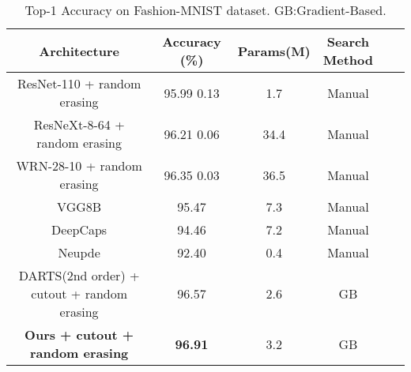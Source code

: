 \documentclass[10pt,a4paper,conference]{IEEEtran}
\begin{document}
\begin{table*}[tbp]
    \centering
    \begin{tabular}{c|c|c|ccc}
    \toprule
    Architecture & Accuracy (\%) & Params(M) & \makecell{Search \\ Method} \\
    \midrule
   ResNet-110 + random erasing \cite{zhong2017random:27} & 95.99  0.13 & 1.7 & Manual \\
    ResNeXt-8-64 + random erasing \cite{zhong2017random:27} & 96.21  0.06 & 34.4 & Manual \\
   WRN-28-10 + random erasing \cite{zhong2017random:27} & 96.35  0.03 & 36.5 & Manual \\ 
   VGG8B \cite{nokland2019training:31} & 95.47 & 7.3 & Manual \\
   DeepCaps \cite{Rajasegaran_2019_CVPR:34} & 94.46  & 7.2 &Manual \\
   Neupde \cite{sun2019neupde:32} & 92.40 & 0.4 & Manual \\
\hline
DARTS(2nd order) + cutout + random erasing \cite{liu2018darts:6} & 96.57 & 2.6 & GB\\
\hline
\textbf{Ours + cutout + random erasing}  &\textbf{96.91} & 3.2 & GB\\
    \bottomrule
    \end{tabular}
    \caption{Top-1 Accuracy on Fashion-MNIST dataset. GB:Gradient-Based.}
    \label{tab:mnist}
\end{table*}
\end{document}
